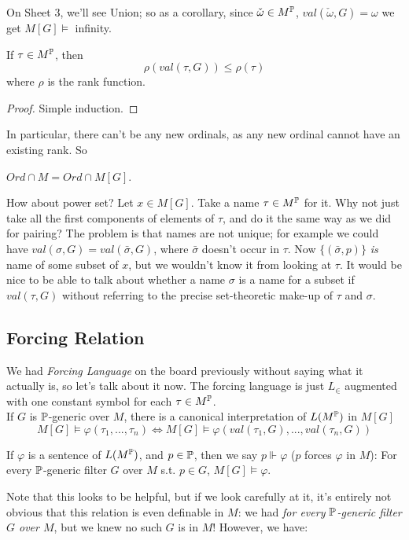 \documentclass[a4paper]{article}
\begin{document}
On Sheet 3, we'll see Union; so as a corollary, since $\check{\omega} \in M^\P$, $val(\check{\omega},G        ) = \omega$ we get $M[G] \vDash$ infinity.

\begin{lemma}
If $\tau \in M^\P$, then 
\[
\rho(val(\tau,G)) \leq \rho(\tau)
\]
where $\rho$ is the rank function.
\begin{proof}
Simple induction.
\end{proof}
\end{lemma}
In particular, there can't be any new ordinals, as any new ordinal cannot have an existing rank. So
\begin{coro}
$Ord \cap M = Ord \cap M[G]$.
\end{coro}

How about power set? Let $x \in M[G]$. Take a name $\tau \in M^\P$ for it. Why not just take all the first components of elements of $\tau$, and do it the same way as we did for pairing? The problem is that names are not unique; for example we could have $val(\sigma,G)=val(\bar{\sigma},G)$, where $\bar{\sigma}$ doesn't occur in $\tau$. Now $\{(\bar{\sigma},p)\}$ \emph{is} name of some subset of $x$, but we wouldn't know it from looking at $\tau$. It would be nice to be able to talk about whether a name $\sigma$ is a name for a subset if $val(\tau,G)$ without referring to the precise set-theoretic make-up of $\tau$ and $\sigma$.

\subsection{Forcing Relation}

We had \emph{Forcing Language} on the board previously without saying what it actually is, so let's talk about it now. The forcing language is just $L_\in$ augmented with one constant symbol for each $\tau \in M^\P$.\\
If $G$ is $\P$-generic over $M$, there is a canonical interpretation of $L(M^\P)$ in $M[G]$
\[
M[G] \vDash \varphi(\tau_1,...,\tau_n) \iff M[G] \vDash \varphi(val(\tau_1,G),...,val(\tau_n,G))
\]

If $\varphi$ is a sentence of $L(M^\P)$, and $p \in \P$, then we say $p\Vdash \varphi$ ($p$ forces $\varphi$ in $M$): For every $\P$-generic filter $G$ over $M$ s.t. $p \in G$, $M[G] \vDash \varphi$.

Note that this looks to be helpful, but if we look carefully at it, it's entirely not obvious that this relation is even definable in $M$: we had \emph{for every $\P$-generic filter $G$ over $M$}, but we knew no such $G$ is in $M$! However, we have:
\end{document}
